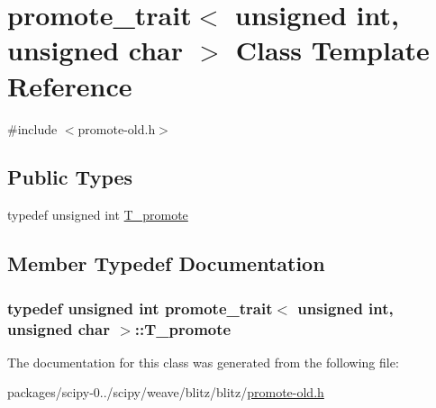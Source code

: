 \hypertarget{classpromote__trait_3_01unsigned_01int_00_01unsigned_01char_01_4}{}\section{promote\+\_\+trait$<$ unsigned int, unsigned char $>$ Class Template Reference}
\label{classpromote__trait_3_01unsigned_01int_00_01unsigned_01char_01_4}


{\ttfamily \#include $<$promote-\/old.\+h$>$}

\subsection*{Public Types}
\begin{DoxyCompactItemize}
\item 
typedef unsigned int \hyperlink{classpromote__trait_3_01unsigned_01int_00_01unsigned_01char_01_4_a9da2abb6c195f778ef25737d2737286c}{T\+\_\+promote}
\end{DoxyCompactItemize}


\subsection{Member Typedef Documentation}
\hypertarget{classpromote__trait_3_01unsigned_01int_00_01unsigned_01char_01_4_a9da2abb6c195f778ef25737d2737286c}{}
\subsubsection[{T\+\_\+promote}]{\setlength{\rightskip}{0pt plus 5cm}typedef unsigned int {\bf promote\+\_\+trait}$<$ unsigned int, unsigned char $>$\+::{\bf T\+\_\+promote}}\label{classpromote__trait_3_01unsigned_01int_00_01unsigned_01char_01_4_a9da2abb6c195f778ef25737d2737286c}


The documentation for this class was generated from the following file\+:\begin{DoxyCompactItemize}
\item 
packages/scipy-\/0../scipy/weave/blitz/blitz/\hyperlink{promote-old_8h}{promote-\/old.\+h}\end{DoxyCompactItemize}
